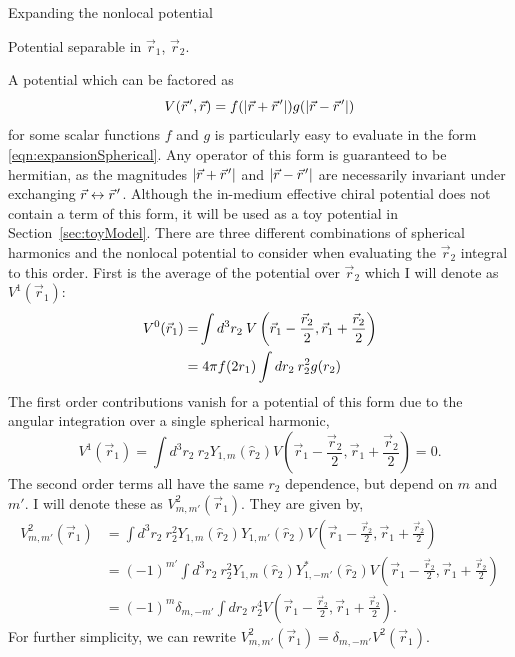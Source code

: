 \begin{section}{Expanding the nonlocal potential}
\begin{subsection}{Potential separable in $\vec{r}_1$, $\vec{r}_2$.\label{subsec:form1}}

A potential which can be factored as 
\begin{equation}
V(\vec{r}\mkern2mu',\vec{r})=f(|\vec{r}+\vec{r}\mkern2mu'|)g(|\vec{r}-\vec{r}\mkern2mu'|)
\end{equation}
for some scalar functions $f$ and $g$ is particularly easy to evaluate in the form \eqref{eqn:expansionSpherical}. Any operator of this form is guaranteed to be hermitian, as the magnitudes $|\vec{r}+\vec{r}\mkern2mu'|$ and $|\vec{r}-\vec{r}\mkern2mu'|$ are necessarily invariant under exchanging $\vec{r} \leftrightarrow \vec{r}\mkern2mu'$. Although the in-medium effective chiral potential does not contain a term of this form, it will be used as a toy potential in Section~\ref{sec:toyModel}. There are three different combinations of spherical harmonics and the nonlocal potential to consider when evaluating the $\vec{r}_2$ integral to this order. First is the average of the potential over $\vec{r}_2$ which I will denote as $V^1(\vec{r}_1)$:
\begin{equation}\label{eq:V0}
\begin{split}
V^0(\vec{r}_1)=&\int d^3r_2\: V\left(\vec{r}_1-\frac{\vec{r}_2}{2},\vec{r}_1+\frac{\vec{r}_2}{2}\right) \\
=&\hspace{.1cm}4\pi f(2r_1) \int dr_2\: r_2^2 g(r_2)
\end{split}
\end{equation}
The first order contributions vanish for a potential of this form due to the angular integration over a single spherical harmonic,
\begin{equation}\label{eq:V1}
V^1(\vec{r}_1)=\int d^3r_2\:  r_2Y_{1,m}(\hat{r}_2)V\left(\vec{r}_1-\frac{\vec{r}_2}{2},\vec{r}_1+\frac{\vec{r}_2}{2}\right)=0.
\end{equation}
The second order terms all have the same $r_2$ dependence, but depend on $m$ and $m'$. I will denote these as $V^2_{m,m'}(\vec{r}_1)$. They are given by,
\begin{equation}\begin{split}
\label{eq:V2}
V^2_{m,m'}(\vec{r}_1)&=\int d^3r_2\: r_2^2Y_{1,m}(\hat{r}_2)Y_{1,m'}(\hat{r}_2)V\left(\vec{r}_1-\frac{\vec{r}_2}{2},\vec{r}_1+\frac{\vec{r}_2}{2}\right) \\
&=(-1)^{m'}\int d^3r_2\: r_2^2Y_{1,m}(\hat{r}_2)Y^*_{1,-m'}(\hat{r}_2)V\left(\vec{r}_1-\frac{\vec{r}_2}{2},\vec{r}_1+\frac{\vec{r}_2}{2}\right)\\
&=(-1)^m\delta_{m,-m'}\int d r_2 \:r_2^4 V\left(\vec{r}_1-\frac{\vec{r}_2}{2},\vec{r}_1+\frac{\vec{r}_2}{2}\right).
\end{split}
\end{equation}
For further simplicity, we can rewrite $V^2_{m,m'}(\vec{r}_1)=\delta_{m,-m'}V^2(\vec{r}_1)$.


\end{subsection}
\end{section}
